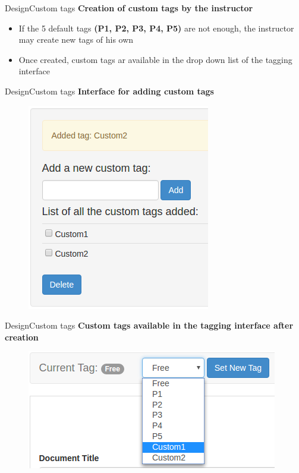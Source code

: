 \documentclass[xcolor=table]{beamer}
\begin{document}
\begin{frame}{Design}{Custom tags}
\textbf{Creation of custom tags by the instructor}
	\begin{itemize}
		\item If the 5 default tags \textbf{(P1, P2, P3, P4, P5)} are
		not enough, the instructor may create new tags of
		his own
		\item Once created, custom tags ar available in the drop down list of the tagging interface
	\end{itemize}
\end{frame}

\begin{frame}{Design}{Custom tags}
\textbf{Interface for adding custom tags}
	\begin{figure}
	\centering
	\includegraphics[width=0.3\linewidth]{media/ct_create}
	\label{fig:ct_create}
	\end{figure}
\end{frame}

\begin{frame}{Design}{Custom tags}
\textbf{Custom tags available in the tagging interface after creation}
	\begin{figure}
	\centering
	\includegraphics[width=0.5\linewidth]{media/ct_set}
	\label{fig:ct_set}
	\end{figure}
\end{frame}
\end{document}
